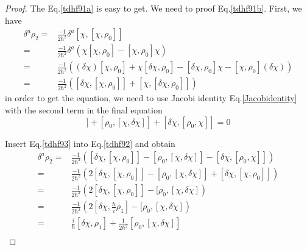   \begin{proof}
    The Eq.\eqref{tdhf91a} is easy to get. We need to proof Eq.\eqref{tdhf91b}. First, we have
    \begin{equation}
      \begin{aligned}
        \delta^a\rho_2 =& \frac{-1}{2\hbar^2}\delta^a [\chi, [\chi, \rho_0]]\\  \label{tdhf92}
        =& \frac{-1}{2\hbar^2}\delta^a \left( \chi[\chi, \rho_0] - [\chi, \rho_0]\chi \right)\\
        =& \frac{-1}{2\hbar^2} \left( (\delta\chi)[\chi, \rho_0] + \chi[\delta\chi,\rho_0] - [\delta\chi, \rho_0]\chi - [\chi, \rho_0](\delta\chi) \right)\\
        =& \frac{-1}{2\hbar^2} \left( [\delta\chi, [\chi, \rho_0]] + [\chi, [\delta\chi,\rho_0]] \right)
      \end{aligned}
    \end{equation}
    in order to get the equation, we need to use Jacobi identity Eq.\eqref{Jacobidentity} with the second term in the final equation
    \begin{equation}
      [\chi, [\delta\chi,\rho_0]] + [\rho_0, [\chi, \delta\chi]] + [\delta\chi, [\rho_0,\chi]] = 0  \label{tdhf93}
    \end{equation}

    Insert Eq.\eqref{tdhf93} into Eq.\eqref{tdhf92} and obtain
    \begin{equation}
      \begin{aligned}
        \delta^a\rho_2 =& \frac{-1}{2\hbar^2} \left( [\delta\chi, [\chi, \rho_0]] - [\rho_0, [\chi, \delta\chi]] - [\delta\chi, [\rho_0,\chi]] \right) \\ 
        =& \frac{-1}{2\hbar^2} \left( 2[\delta\chi, [\chi, \rho_0]] - [\rho_0, [\chi, \delta\chi]] + [\delta\chi, [\chi,\rho_0]] \right) \\ 
        =& \frac{-1}{2\hbar^2} \left( 2[\delta\chi, [\chi, \rho_0]] - [\rho_0, [\chi, \delta\chi] \right) \\ 
        =& \frac{-1}{2\hbar^2} \left( 2[\delta\chi, \frac{\hbar}{i}\rho_1] - [\rho_0, [\chi, \delta\chi] \right) \\ 
        =& \frac{i}{\hbar} [\delta\chi,\rho_1] + \frac{1}{2\hbar^2}[\rho_0, [\chi, \delta\chi] ]\\ 
      \end{aligned}
    \end{equation}
  \end{proof}

